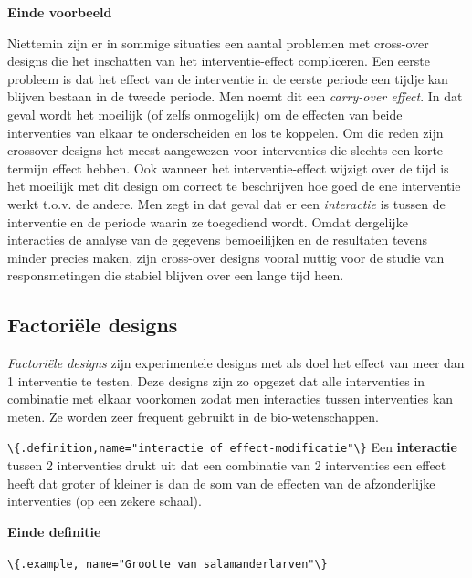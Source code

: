\documentclass[
  12pt,dutch,coursenotes]{book}
\newcommand{\passthrough}[1]{#1}
\begin{document}
\textbf{Einde voorbeeld}

Niettemin zijn er in sommige situaties een aantal problemen met cross-over
designs die het inschatten van het interventie-effect compliceren. Een
eerste probleem is dat het effect van de interventie in de eerste periode
een tijdje kan blijven bestaan in de tweede periode. Men noemt dit een
\emph{carry-over effect}. In dat geval wordt het moeilijk (of zelfs
onmogelijk) om de effecten van beide interventies van elkaar te
onderscheiden en los te koppelen. Om die reden zijn crossover designs het meest aangewezen voor interventies die slechts een korte termijn effect hebben. Ook wanneer het interventie-effect wijzigt over de tijd
is het moeilijk met dit design om correct te beschrijven hoe goed
de ene interventie werkt t.o.v. de andere. Men zegt in dat geval dat er een
\emph{interactie} is tussen de interventie en de periode waarin ze
toegediend wordt. Omdat dergelijke interacties de analyse van de gegevens
bemoeilijken en de resultaten tevens minder precies maken, zijn cross-over
designs vooral nuttig voor de studie van responsmetingen die stabiel
blijven over een lange tijd heen.

\hypertarget{factoriuxeble-designs}{%
\subsection{Factoriële designs}\label{factoriuxeble-designs}}

\emph{Factoriële designs} zijn experimentele designs met als doel het effect van
meer dan 1 interventie te testen. Deze designs zijn zo opgezet dat alle interventies in combinatie met elkaar voorkomen zodat men interacties
tussen interventies kan meten. Ze worden zeer frequent gebruikt in de bio-wetenschappen.

\passthrough{\lstinline!\{.definition,name="interactie of effect-modificatie"\}!}
Een \textbf{interactie} tussen 2 interventies drukt uit dat een combinatie
van 2 interventies een effect heeft dat groter of kleiner is dan de som van
de effecten van de afzonderlijke interventies (op een zekere schaal).

\textbf{Einde definitie}

\passthrough{\lstinline!\{.example, name="Grootte van salamanderlarven"\}!}
\end{document}
